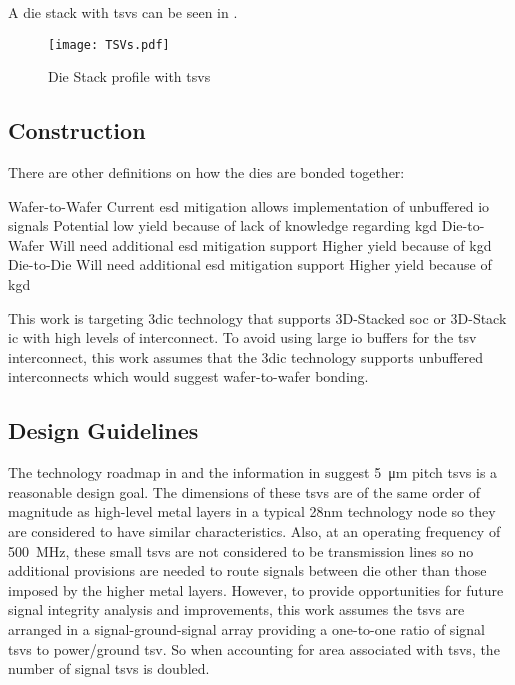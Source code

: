 A die stack with \acp{tsv} can be seen in .

\begin{figure}[h]
\centering
\captionsetup{justification=centering}
\captionsetup{width=.9\linewidth}
\centerline{
\mbox{\texttt{[image: TSVs.pdf]}}
}
\caption{Die Stack profile \cite{itrs2015_interconn} with \acp{tsv}}
\label{fig:tsv}
\end{figure}

\subsection{Construction}
\label{sec:3dic construction}

There are other definitions on how the dies are bonded together:
\begin{outline}
  \1 Wafer-to-Wafer
    \2 Current \ac{esd} mitigation allows implementation of unbuffered \ac{io} signals
    \2 Potential low yield because of lack of knowledge regarding \ac{kgd}
  \1 Die-to-Wafer
    \2 Will need additional \ac{esd} mitigation support
    \2 Higher yield because of \ac{kgd}
  \1 Die-to-Die
    \2 Will need additional \ac{esd} mitigation support
    \2 Higher yield because of \ac{kgd}
\end{outline}

This work is targeting \ac{3dic} technology that supports 3D-Stacked \ac{soc} or 3D-Stack \ac{ic} with high levels of interconnect.
To avoid using large \ac{io} buffers for the \ac{tsv} interconnect, this work assumes that the \ac{3dic} technology supports unbuffered interconnects which would suggest wafer-to-wafer bonding.
\iffalse because of the existing \ac{esd} mitigation during wafer handling although it is anticipated that improved \ac{esd} mitigation will be introduced in future manufacturing steps. \fi

\subsection{Design Guidelines}
\label{sec:3dic Design Guidelines}

The technology roadmap in \cite{itrs2015_interconn} and the information in \cite{patti2014} suggest \SI{5}{\micro\meter} pitch \acp{tsv} is a reasonable design goal. 
The dimensions of these \acp{tsv} are of the same order of magnitude as high-level metal layers in a typical 28nm technology node so they are considered to have similar characteristics.
Also, at an operating frequency of \SI[per-mode=symbol]{500}{\mega \hertz}, these small \acp{tsv} are not considered to be transmission lines so no additional provisions are needed to route signals between die other than those imposed by the higher metal layers.
However, to provide opportunities for future signal integrity analysis and improvements, this work assumes the \acp{tsv} are arranged in a signal-ground-signal array providing a one-to-one ratio of signal \acp{tsv} to power/ground \ac{tsv}.
So when accounting for area associated with \acp{tsv}, the number of signal \acp{tsv} is doubled.

